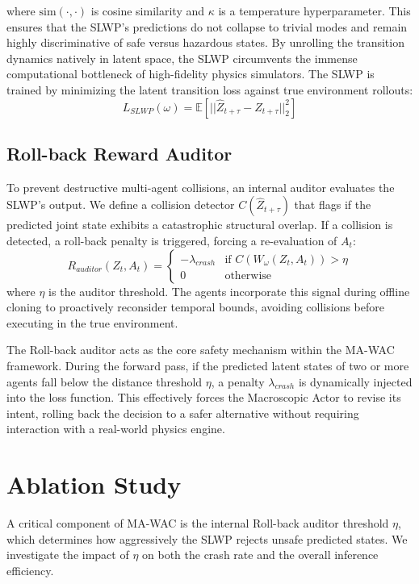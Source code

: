 \documentclass[conference]{IEEEtran}
\begin{document}
where $\text{sim}(\cdot, \cdot)$ is cosine similarity and $\kappa$ is a temperature hyperparameter. This ensures that the SLWP's predictions do not collapse to trivial modes and remain highly discriminative of safe versus hazardous states.
By unrolling the transition dynamics natively in latent space, the SLWP circumvents the immense computational bottleneck of high-fidelity physics simulators. The SLWP is trained by minimizing the latent transition loss against true environment rollouts:
\begin{equation}
L_{SLWP}(\omega) = \mathbb{E} \left[ || \hat{Z}_{t+\tau} - Z_{t+\tau} ||_2^2 \right]
\end{equation}

\subsection{Roll-back Reward Auditor}
To prevent destructive multi-agent collisions, an internal auditor evaluates the SLWP's output. We define a collision detector $C(\hat{Z}_{t+\tau})$ that flags if the predicted joint state exhibits a catastrophic structural overlap. If a collision is detected, a roll-back penalty is triggered, forcing a re-evaluation of $A_t$:
\begin{equation}
R_{auditor}(Z_t, A_t) = 
\begin{cases} 
-\lambda_{crash} & \text{if } C(W_\omega(Z_t, A_t)) > \eta \\
0 & \text{otherwise}
\end{cases}
\end{equation}
where $\eta$ is the auditor threshold. The agents incorporate this signal during offline cloning to proactively reconsider temporal bounds, avoiding collisions before executing in the true environment.

The Roll-back auditor acts as the core safety mechanism within the MA-WAC framework. During the forward pass, if the predicted latent states of two or more agents fall below the distance threshold $\eta$, a penalty $\lambda_{crash}$ is dynamically injected into the loss function. This effectively forces the Macroscopic Actor to revise its intent, rolling back the decision to a safer alternative without requiring interaction with a real-world physics engine.

\section{Ablation Study}\label{sec:ablation}
A critical component of MA-WAC is the internal Roll-back auditor threshold $\eta$, which determines how aggressively the SLWP rejects unsafe predicted states. We investigate the impact of $\eta$ on both the crash rate and the overall inference efficiency.
\end{document}
